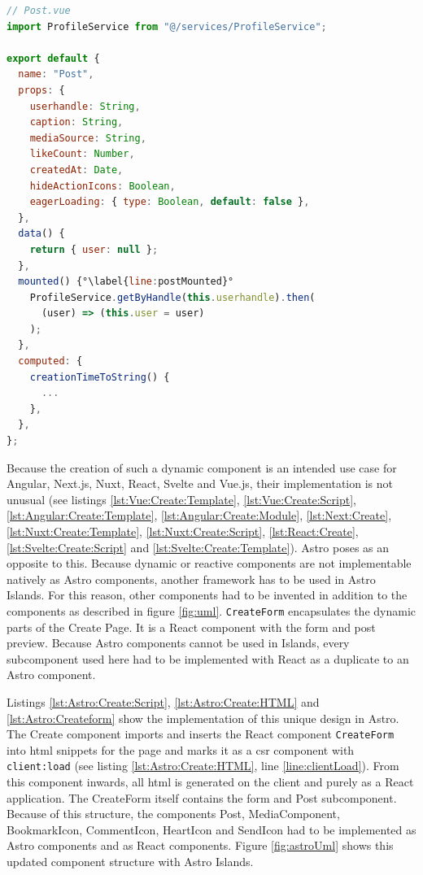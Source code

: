 \documentclass[a4paper, 10pt]{article}
\begin{document}
\begin{lstlisting}[caption=Post in Vue.js (Script), label={lst:Vue:Post:Script}, language=JavaScript, firstnumber=26, escapechar=°]
// Post.vue
import ProfileService from "@/services/ProfileService";

export default {
  name: "Post",
  props: {
    userhandle: String,
    caption: String,
    mediaSource: String,
    likeCount: Number,
    createdAt: Date,
    hideActionIcons: Boolean,
    eagerLoading: { type: Boolean, default: false },
  },
  data() {
    return { user: null };
  },
  mounted() {°\label{line:postMounted}°
    ProfileService.getByHandle(this.userhandle).then(
      (user) => (this.user = user)
    );
  },
  computed: {
    creationTimeToString() {
      ...
    },
  },
};
\end{lstlisting}

Because the creation of such a dynamic component is an intended use case for Angular, Next.js, Nuxt, React, Svelte and Vue.js, their implementation is not unusual (see listings \ref{lst:Vue:Create:Template}, \ref{lst:Vue:Create:Script}, \ref{lst:Angular:Create:Template}, \ref{lst:Angular:Create:Module}, \ref{lst:Next:Create}, \ref{lst:Nuxt:Create:Template}, \ref{lst:Nuxt:Create:Script}, \ref{lst:React:Create}, \ref{lst:Svelte:Create:Script} and \ref{lst:Svelte:Create:Template}).
Astro poses as an opposite to this.
Because dynamic or reactive components are not implementable natively as Astro components, another framework has to be used in Astro Islands.
For this reason, other components had to be invented in addition to the components as described in figure \ref{fig:uml}.
\verb|CreateForm| encapsulates the dynamic parts of the Create Page.
It is a React component with the form and post preview.
Because Astro components cannot be used in Islands, every subcomponent used here had to be implemented with React as a duplicate to an Astro component.

Listings \ref{lst:Astro:Create:Script}, \ref{lst:Astro:Create:HTML} and \ref{lst:Astro:Createform} show the implementation of this unique design in Astro.
The Create component imports and inserts the React component \verb|CreateForm| into \acrshort{html} snippets for the page and marks it as a \acrshort{csr} component with \verb|client:load| (see listing \ref{lst:Astro:Create:HTML}, line \ref{line:clientLoad}).
From this component inwards, all \acrshort{html} is generated on the client and purely as a React application.
The CreateForm itself contains the form and Post subcomponent.
Because of this structure, the components Post, MediaComponent, BookmarkIcon, CommentIcon, HeartIcon and SendIcon had to be implemented as Astro components and as React components.
Figure \ref{fig:astroUml} shows this updated component structure with Astro Islands.
\end{document}
